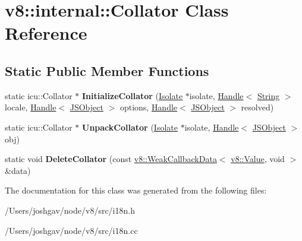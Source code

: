 \hypertarget{classv8_1_1internal_1_1_collator}{}\section{v8\+:\+:internal\+:\+:Collator Class Reference}
\label{classv8_1_1internal_1_1_collator}
\subsection*{Static Public Member Functions}
\begin{DoxyCompactItemize}
\item 
static icu\+::\+Collator $\ast$ {\bfseries Initialize\+Collator} (\hyperlink{classv8_1_1internal_1_1_isolate}{Isolate} $\ast$isolate, \hyperlink{classv8_1_1internal_1_1_handle}{Handle}$<$ \hyperlink{classv8_1_1internal_1_1_string}{String} $>$ locale, \hyperlink{classv8_1_1internal_1_1_handle}{Handle}$<$ \hyperlink{classv8_1_1internal_1_1_j_s_object}{J\+S\+Object} $>$ options, \hyperlink{classv8_1_1internal_1_1_handle}{Handle}$<$ \hyperlink{classv8_1_1internal_1_1_j_s_object}{J\+S\+Object} $>$ resolved)\hypertarget{classv8_1_1internal_1_1_collator_ac7bf407efae3cfa2bfc11818086e3ef0}{}\label{classv8_1_1internal_1_1_collator_ac7bf407efae3cfa2bfc11818086e3ef0}

\item 
static icu\+::\+Collator $\ast$ {\bfseries Unpack\+Collator} (\hyperlink{classv8_1_1internal_1_1_isolate}{Isolate} $\ast$isolate, \hyperlink{classv8_1_1internal_1_1_handle}{Handle}$<$ \hyperlink{classv8_1_1internal_1_1_j_s_object}{J\+S\+Object} $>$ obj)\hypertarget{classv8_1_1internal_1_1_collator_a19c7973ff5c7de06271df8bf52b8dfe5}{}\label{classv8_1_1internal_1_1_collator_a19c7973ff5c7de06271df8bf52b8dfe5}

\item 
static void {\bfseries Delete\+Collator} (const \hyperlink{classv8_1_1_weak_callback_data}{v8\+::\+Weak\+Callback\+Data}$<$ \hyperlink{classv8_1_1_value}{v8\+::\+Value}, void $>$ \&data)\hypertarget{classv8_1_1internal_1_1_collator_aab1e9b6510389a727bde190225ad2916}{}\label{classv8_1_1internal_1_1_collator_aab1e9b6510389a727bde190225ad2916}

\end{DoxyCompactItemize}


The documentation for this class was generated from the following files\+:\begin{DoxyCompactItemize}
\item 
/\+Users/joshgav/node/v8/src/i18n.\+h\item 
/\+Users/joshgav/node/v8/src/i18n.\+cc\end{DoxyCompactItemize}
